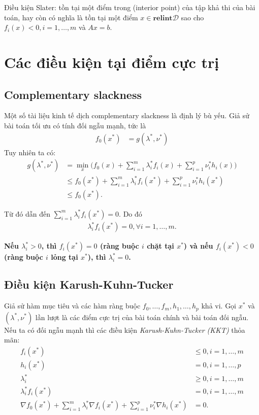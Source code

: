 \documentclass{book}
\begin{document}
Điều kiện Slater: tồn tại một điểm trong (interior point) của tập khả thi của bài toán,
hay còn có nghĩa là tồn tại một điểm $x \in \mathbf{relint} \mathcal{D}$ sao cho $f_i(x) < 0, i = 1, \ldots, m$ và $Ax = b$.


\section{Các điều kiện tại điểm cực trị}

\subsection{Complementary slackness}
Một số tài liệu kinh tế dịch complementary slackness là định lý bù yếu.
Giả sử bài toán tối ưu có tính đối ngẫu mạnh, tức là
\begin{align*}
f_0(x^*) & = g(\lambda^*, \nu^*)
\end{align*}
Tuy nhiên ta có:
\begin{align*}
g(\lambda^*, \nu^*)	& = \min_x \Big( f_0(x) + \sum_{i = 1}^m \lambda_i^* f_i(x) + \sum_{i = 1}^p \nu_i^* h_i(x) \Big)\\
	& \leq f_0(x^*) + \sum_{i = 1}^m \lambda_i^* f_i(x^*) + \sum_{i = 1}^p \nu_i^* h_i(x^*) \\
	& \leq f_0(x^*).
\end{align*}

Từ đó dẫn đến $\sum_{i = 1}^m \lambda_i^* f_i(x^*) = 0$. 
Do đó
\begin{align}
\lambda_i^* f_i(x^*) = 0, \forall i = 1, \ldots, m.
\end{align}

\textbf{Nếu $\lambda_i^* > 0$, thì $f_i(x^*) = 0$ (ràng buộc $i$ chặt tại $x^*$) và nếu $f_i(x^*) < 0$ (ràng buộc $i$ lỏng tại $x^*$), thì $\lambda_i^* = 0$.}


\subsection{Điều kiện Karush-Kuhn-Tucker}

Giả sử hàm mục tiêu và các hàm ràng buộc $f_0, \ldots, f_m, h_1, \ldots, h_p$ khả vi.
Gọi $x^*$ và $(\lambda^*, \nu^*)$ lần lượt là các điểm cực trị của bài toán chính và bài toán đối ngẫu.
Nếu ta có đối ngẫu mạnh thì các điều kiện \textit{Karush-Kuhn-Tucker (KKT)} thỏa mãn:
\begin{align}
f_i(x^*) & \leq 0, i = 1, \ldots , m \label{eq:kkt1}\\
h_i(x^*) & = 0, i = 1, \ldots , p \label{eq:kkt2}\\
\lambda_i^* & \geq 0, i = 1, \ldots , m \label{eq:kkt3}\\
\lambda_i^* f_i(x^*) & = 0, i = 1, \ldots , m \label{eq:kkt4}\\
\nabla f_0(x^*) + \sum_{i = 1}^m \lambda_i^* \nabla f_i(x^*) + \sum_{i = 1}^p \nu_i^* \nabla h_i(x^*) & = 0. \label{eq:kkt5}
\end{align}
\end{document}
